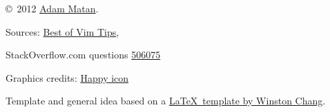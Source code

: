 \documentclass[10pt,landscape]{article}
\begin{document}
\begin{multicols}{3}
{\copyright\ 2012 \href{http://matan.name}{Adam Matan}.}

\begin{tiny}
Sources: \href{http://rayninfo.co.uk/vimtips.html}{Best of Vim Tips},

StackOverflow.com questions \href{http://stackoverflow.com/questions/506075/how-do-i-fix-the-indentation-of-an-entire-file-in-vi}{506075}

Graphics credits: \href{http://commons.wikimedia.org/wiki/File:Gnome-face-smile.svg}{Happy icon}

Template and general idea based on a \href{http://www.stdout.org/~winston/latex/}{\LaTeX\ template by Winston Chang}.
\end{tiny}




\end{multicols}
\end{document}
